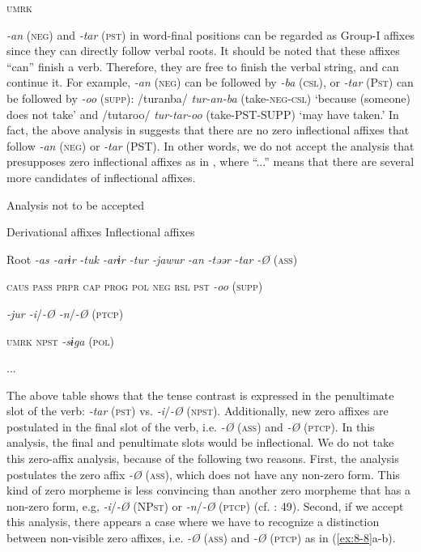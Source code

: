             \textsc{umrk}
\z
\z

\textit{-an} (\textsc{neg}) and \textit{-tar} (\textsc{pst}) in word-final positions can be regarded as Group-I affixes since they can directly follow verbal roots. It should be noted that these affixes “can” finish a verb. Therefore, they are free to finish the verbal string, and can continue it. For example, \textit{-an} (\textsc{neg}) can be followed by \textit{-ba} (\textsc{csl}), or \textit{-tar} (P\textsc{st}) can be followed by \textit{-oo} (\textsc{supp}): /turanba/ \textit{tur-an-ba} (take-\textsc{neg}-\textsc{csl}) ‘because (someone) does not take’ and /tutaroo/ \textit{tur-tar-oo} (take-PST-SUPP) ‘may have taken.’ In fact, the above analysis in  suggests that there are no zero inflectional affixes that follow \textit{-an} (\textsc{neg}) or \textit{-tar} (PST). In other words, we do not accept the analysis that presupposes zero inflectional affixes as in , where “...” means that there are several more candidates of inflectional affixes.

\ea\label{ex:8-7}
  Analysis not to be accepted

    Derivational affixes  Inflectional affixes

  Root  \textit{-as  -arɨr} %
\textit{-tuk  -arɨr  -tur  -jawur} %
\textit{-an} %
\textit{-təər} %
\textit{-tar  -Ø} (\textsc{ass})

    \textsc{caus}  \textsc{pass}  \textsc{prpr}  \textsc{cap}  \textsc{prog}  \textsc{pol}  \textsc{neg}  \textsc{rsl}  \textsc{pst}  \textit{-oo} (\textsc{supp})

          \textit{-jur    -i}/\textit{-Ø  -n}/\textit{-Ø} (\textsc{ptcp})

          \textsc{umrk}    \textsc{npst}  \textit{-sɨga} (\textsc{pol})

                ...
\z

The above table shows that the tense contrast is expressed in the penultimate slot of the verb: \textit{-tar} (\textsc{pst}) vs. \textit{-i}/\textit{-Ø} (\textsc{npst}). Additionally, new zero affixes are postulated in the final slot of the verb, i.e. \textit{-Ø} (\textsc{ass}) and \textit{-Ø} (\textsc{ptcp}). In this analysis, the final and penultimate slots would be inflectional. We do not take this zero-affix analysis, because of the following two reasons. First, the analysis postulates the zero affix \textit{-Ø} (\textsc{ass}), which does not have any non-zero form. This kind of zero morpheme is less convincing than another zero morpheme that has a non-zero form, e.g, \textit{-i}/\textit{-Ø} (NP\textsc{st}) or \textit{-n}/\textit{-Ø} (\textsc{ptcp}) (cf. \citealt{Haas1974}: 49). Second, if we accept this analysis, there appears a case where we have to recognize a distinction between non-visible zero affixes, i.e. \textit{-Ø} (\textsc{ass}) and \textit{-Ø} (\textsc{ptcp}) as in (\ref{ex:8-8}a-b).

